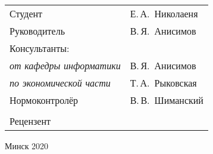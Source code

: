 \begin{titlepage}
\begin{center}
    \begin{tabular}{ p{}p{} }
      Студент & Е.\,А.~Николаеня \\
      Руководитель & В.\,Я.~Анисимов \\
      Консультанты: &\\
      \hspace*{3ex}\emph{от кафедры информатики} & В.\,Я.~Анисимов \\
      \hspace*{3ex}\emph{по экономической части} & Т.\,А.~Рыковская \\
      Нормоконтролёр & В.\,В.~Шиманский\\
      & \\
      Рецензент &
    \end{tabular}
    
    \vfill
    {\normalsize Минск 2020}
  \end{center}
\end{titlepage}
